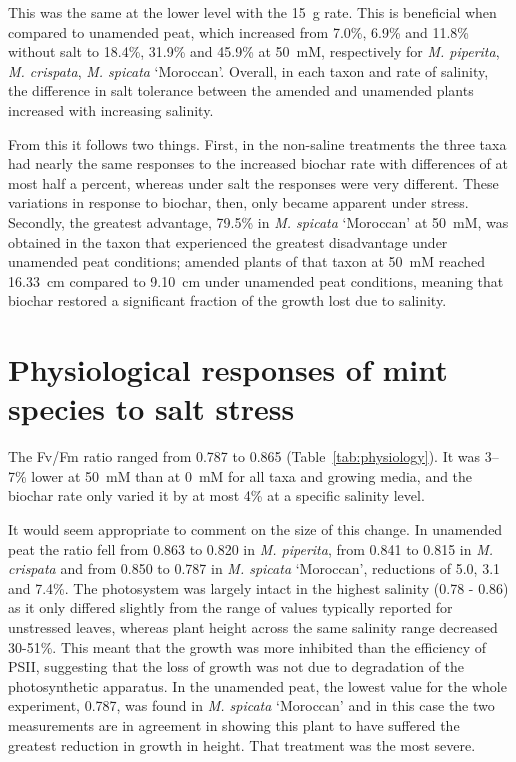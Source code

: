 This was the same at the lower level with the 15~g rate. This is beneficial when compared to unamended peat, which increased from 7.0\%, 6.9\% and 11.8\% without salt to 18.4\%, 31.9\% and 45.9\% at 50~mM, respectively for \textit{M. piperita}, \textit{M. crispata}, \textit{M. spicata} `Moroccan'. Overall, in each taxon and rate of salinity, the difference in salt tolerance between the amended and unamended plants increased with increasing salinity.

From this it follows two things. First, in the non-saline treatments the three taxa had nearly the same responses to the increased biochar rate with differences of at most half a percent, whereas under salt the responses were very different. These variations in response to biochar, then, only became apparent under stress. Secondly, the greatest advantage, 79.5\% in \textit{M. spicata} `Moroccan' at 50~mM, was obtained in the taxon that experienced the greatest disadvantage under unamended peat conditions; amended plants of that taxon at 50~mM reached 16.33~cm compared to 9.10~cm under unamended peat conditions, meaning that biochar restored a significant fraction of the growth lost due to salinity.

\section{Physiological responses of mint species to salt stress}

The Fv/Fm ratio ranged from 0.787 to 0.865 (Table~\ref{tab:physiology}). It was 3–7\% lower at 50~mM than at 0~mM for all taxa and growing media, and the biochar rate only varied it by at most 4\% at a specific salinity level.

It would seem appropriate to comment on the size of this change. In unamended peat the ratio fell from 0.863 to 0.820 in \textit{M. piperita}, from 0.841 to 0.815 in \textit{M. crispata} and from 0.850 to 0.787 in \textit{M. spicata} `Moroccan', reductions of 5.0, 3.1 and 7.4\%. The photosystem was largely intact in the highest salinity (0.78 - 0.86) as it only differed slightly from the range of values typically reported for unstressed leaves, whereas plant height across the same salinity range decreased 30-51\%. This meant that the growth was more inhibited than the efficiency of PSII, suggesting that the loss of growth was not due to degradation of the photosynthetic apparatus. In the unamended peat, the lowest value for the whole experiment, 0.787, was found in \textit{M. spicata} `Moroccan' and in this case the two measurements are in agreement in showing this plant to have suffered the greatest reduction in growth in height. That treatment was the most severe.

